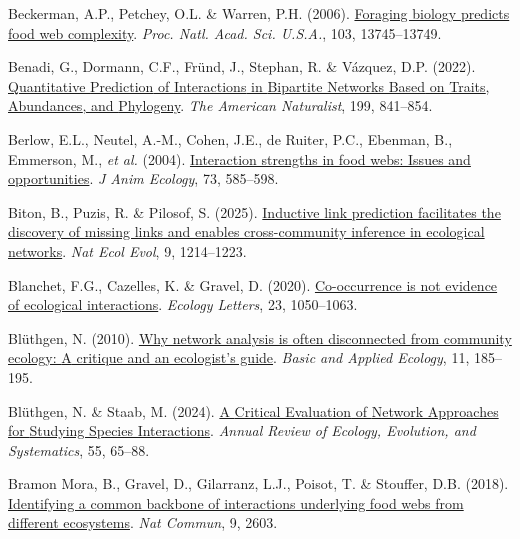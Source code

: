 \documentclass[
]{article}
\newlength{\cslhangindent}
\newenvironment{CSLReferences}[2] %
 {\begin{list}{}{%
  \setlength{\itemindent}{0pt}
  \setlength{\leftmargin}{0pt}
  \setlength{\parsep}{0pt}
  \ifodd #1
   \setlength{\leftmargin}{\cslhangindent}
   \setlength{\itemindent}{-1\cslhangindent}
  \fi
  \setlength{\itemsep}{#2\baselineskip}}}
 {\end{list}}
\begin{document}
\begin{CSLReferences}{1}{0}
Beckerman, A.P., Petchey, O.L. \& Warren, P.H. (2006).
\href{https://doi.org/10.1073/pnas.0603039103}{Foraging biology predicts
food web complexity}. \emph{Proc. Natl. Acad. Sci. U.S.A.}, 103,
13745--13749.

Benadi, G., Dormann, C.F., Fründ, J., Stephan, R. \& Vázquez, D.P.
(2022). \href{https://doi.org/10.1086/714420}{Quantitative {Prediction}
of {Interactions} in {Bipartite Networks Based} on {Traits},
{Abundances}, and {Phylogeny}}. \emph{The American Naturalist}, 199,
841--854.

Berlow, E.L., Neutel, A.-M., Cohen, J.E., de Ruiter, P.C., Ebenman, B.,
Emmerson, M., \emph{et al.} (2004).
\href{https://doi.org/10.1111/j.0021-8790.2004.00833.x}{Interaction
strengths in food webs: Issues and opportunities}. \emph{J Anim
Ecology}, 73, 585--598.

Biton, B., Puzis, R. \& Pilosof, S. (2025).
\href{https://doi.org/10.1038/s41559-025-02715-6}{Inductive link
prediction facilitates the discovery of missing links and enables
cross-community inference in ecological networks}. \emph{Nat Ecol Evol},
9, 1214--1223.

Blanchet, F.G., Cazelles, K. \& Gravel, D. (2020).
\href{https://doi.org/10.1111/ele.13525}{Co-occurrence is not evidence
of ecological interactions}. \emph{Ecology Letters}, 23, 1050--1063.

Blüthgen, N. (2010).
\href{https://doi.org/10.1016/j.baae.2010.01.001}{Why network analysis
is often disconnected from community ecology: {A} critique and an
ecologist's guide}. \emph{Basic and Applied Ecology}, 11, 185--195.

Blüthgen, N. \& Staab, M. (2024).
\href{https://doi.org/10.1146/annurev-ecolsys-102722-021904}{A {Critical
Evaluation} of {Network Approaches} for {Studying Species
Interactions}}. \emph{Annual Review of Ecology, Evolution, and
Systematics}, 55, 65--88.

Bramon Mora, B., Gravel, D., Gilarranz, L.J., Poisot, T. \& Stouffer,
D.B. (2018).
\href{https://doi.org/10.1038/s41467-018-05056-0}{Identifying a common
backbone of interactions underlying food webs from different
ecosystems}. \emph{Nat Commun}, 9, 2603.


\end{CSLReferences}
\end{document}
